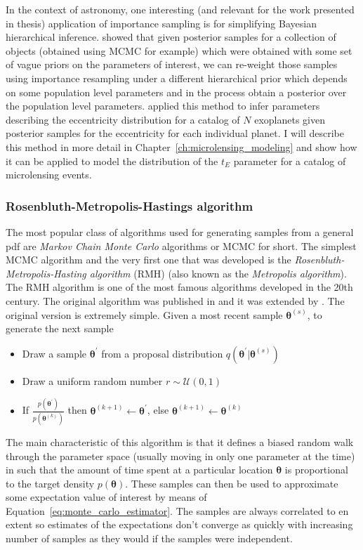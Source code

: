 \documentclass[12pt,dvipsnames]{report}
\renewcommand{\vec}[1]{\boldsymbol{\mathbf{#1}}}
\begin{document}
In the context of astronomy, one  interesting (and relevant for the work presented 
in thesis) application of importance sampling is for simplifying Bayesian hierarchical 
inference. \citet{2010ApJ...725.2166H} showed that given posterior samples for a 
collection of objects (obtained using MCMC for example) which were obtained with some 
set of vague priors on the parameters of interest, we can re-weight those samples using 
importance resampling under a different hierarchical prior which depends on some 
population level parameters and in the process obtain a posterior over the population 
level parameters. \citet{2010ApJ...725.2166H} applied this method to infer parameters 
describing the eccentricity  distribution for a catalog of $N$ exoplanets given 
posterior samples for the eccentricity for each individual planet. I will describe 
this method in more detail in Chapter~\ref{ch:microlensing_modeling} and show how it can be
applied to model the distribution of the $t_E$ parameter for a catalog of microlensing 
events.

\subsubsection{Rosenbluth-Metropolis-Hastings algorithm}
The most popular class of algorithms used for generating samples 
from a general pdf are 
\textsl{Markov Chain Monte Carlo} algorithms or MCMC for short. The simplest 
MCMC algorithm and the very first one that was developed is the
\textsl{Rosenbluth-Metropolis-Hasting algorithm} (RMH) (also known as the 
\textsl{Metropolis algorithm}). The RMH algorithm is one of 
the most famous algorithms developed in the 20th century. The original algorithm was 
published in \citet{1953JChPh..21.1087M} and it was extended by 
\citet{1970Bimka..57...97H}. The original version is extremely simple. 
Given a most recent sample $\vec\theta^{(s)}$, to generate the next sample
\begin{itemize}
    \item Draw a sample $\vec{\theta}^\prime$ from a proposal distribution $q(\bm\theta^\prime\lvert\vec\theta^{(s)})$ 
    \item Draw a uniform random number $r\sim\mathcal{U}(0,1)$
    \item If $\frac{p(\bm\theta^\prime)}{p(\vec\theta^{(k)})}$ then $\bm\theta^{(k+1)}\leftarrow \bm\theta^\prime$, else $\bm\theta^{(k+1)}\leftarrow\bm\theta^{(k)}$
\end{itemize}
The main characteristic of this algorithm is that it defines a biased random walk
through the parameter space (usually moving in only one parameter at the time) 
in such that the amount of time spent at a particular location $\vec\theta$ is 
proportional to the target density $p(\vec\theta)$.
These samples can then be used to approximate some expectation value of interest 
by means of Equation~\ref{eq:monte_carlo_estimator}. The samples are always correlated 
to en extent so estimates of the expectations don't converge as quickly with increasing 
number of samples as they would if the samples were independent.
\end{document}
